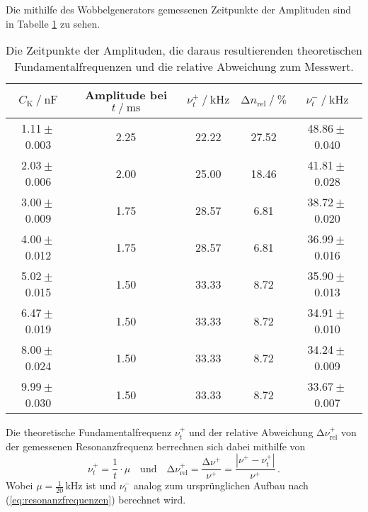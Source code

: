 Die mithilfe des Wobbelgenerators gemessenen Zeitpunkte der Amplituden sind in Tabelle \ref{tab:amplituden} zu sehen.
\begin{table}[H]
    \centering
    \caption{   Die Zeitpunkte der Amplituden, die daraus resultierenden theoretischen
                Fundamentalfrequenzen und die relative Abweichung zum Messwert.}
    \label{tab:amplituden}
    \begin{tabular}{c c c c c}
        \toprule
        ${C_\text{K}} \mathbin{/} \unit{\nano\farad}$ &
        {Amplitude bei $t \mathbin{/} \unit{\milli\second}$} &
        $\nu^+_{t} \mathbin{/} \unit{\kilo\hertz}$ &
        $\increment n_{\text{rel}} \mathbin{/} \unit{\percent}$ &
        $\nu^-_{t} \mathbin{/} \unit{\kilo\hertz}$ \\
        \midrule
           1.11${}\pm{}$0.003 &      2.25 &    22.22 &  27.52 & 48.86${}\pm{}$0.040 \\
           2.03${}\pm{}$0.006 &      2.00 &    25.00 &  18.46 & 41.81${}\pm{}$0.028 \\
           3.00${}\pm{}$0.009 &      1.75 &    28.57 &   6.81 & 38.72${}\pm{}$0.020 \\
           4.00${}\pm{}$0.012 &      1.75 &    28.57 &   6.81 & 36.99${}\pm{}$0.016 \\
           5.02${}\pm{}$0.015 &      1.50 &    33.33 &   8.72 & 35.90${}\pm{}$0.013 \\
           6.47${}\pm{}$0.019 &      1.50 &    33.33 &   8.72 & 34.91${}\pm{}$0.010 \\
           8.00${}\pm{}$0.024 &      1.50 &    33.33 &   8.72 & 34.24${}\pm{}$0.009 \\
           9.99${}\pm{}$0.030 &      1.50 &    33.33 &   8.72 & 33.67${}\pm{}$0.007 \\
        \bottomrule
        \end{tabular}
\end{table}

Die theoretische Fundamentalfrequenz $\nu^+_{t}$ und der relative Abweichung $\increment \nu^+_{\text{rel}}$
von der gemessenen Resonanzfrequenz berrechnen sich dabei mithilfe von
\begin{equation*}
    \nu^+_{t} = \frac {1} {t} \cdot \mu
    \quad\text{und}\quad 
    \increment \nu^+_{\text{rel}} = \frac{\increment \nu^+}{\nu^+}=\frac{\left|\nu^+-\nu^+_{t}\right|}{\nu^+} \, .
\end{equation*}
Wobei $\mu = \frac {1} {20} \, \unit{\kilo\hertz}$ ist und $\nu^-_{t}$ analog zum ursprünglichen Aufbau nach (\ref{eq:resonanzfrequenzen}) berechnet wird.